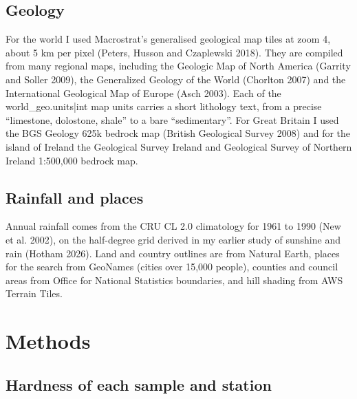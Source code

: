 \documentclass[11pt,a4paper]{article}
\begin{document}
\subsection{Geology}

For the world I used Macrostrat's generalised geological map tiles at zoom 4, about 5 km per pixel (Peters, Husson and Czaplewski 2018). They are compiled from many regional maps, including the Geologic Map of North America (Garrity and Soller 2009), the Generalized Geology of the World (Chorlton 2007) and the International Geological Map of Europe (Asch 2003). Each of the {{world_geo.units|int}} map units carries a short lithology text, from a precise ``limestone, dolostone, shale'' to a bare ``sedimentary''. For Great Britain I used the BGS Geology 625k bedrock map (British Geological Survey 2008) and for the island of Ireland the Geological Survey Ireland and Geological Survey of Northern Ireland 1:500,000 bedrock map.

\subsection{Rainfall and places}

Annual rainfall comes from the CRU CL 2.0 climatology for 1961 to 1990 (New et al. 2002), on the half-degree grid derived in my earlier study of sunshine and rain (Hotham 2026). Land and country outlines are from Natural Earth, places for the search from GeoNames (cities over 15,000 people), counties and council areas from Office for National Statistics boundaries, and hill shading from AWS Terrain Tiles.

\section{Methods}

\subsection{Hardness of each sample and station}
\end{document}

